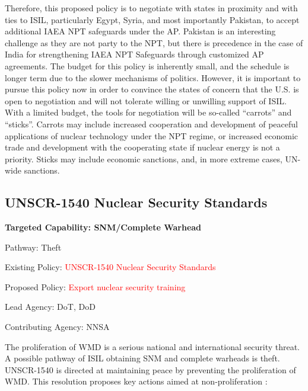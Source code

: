 \documentclass{report}
\begin{document}
Therefore, this proposed policy is to negotiate with states in proximity and with ties to ISIL, particularly Egypt, Syria, and most importantly Pakistan, to accept additional IAEA NPT safeguards under the AP. Pakistan is an interesting challenge as they are not party to the NPT, but there is precedence in the case of India for strengthening IAEA NPT Safeguards through customized AP agreements. The budget for this policy is inherently small, and the schedule is longer term due to the slower mechanisms of politics.  However, it is important to pursue this policy now in order to convince the states of concern that the U.S. is open to negotiation and will not tolerate willing or unwilling support of ISIL. With a limited budget, the tools for negotiation will be so-called \enquote{carrots} and \enquote{sticks}. Carrots may include increased cooperation and development of peaceful applications of nuclear technology under the NPT regime, or increased economic trade and development with the cooperating state if nuclear energy is not a priority. Sticks may include economic sanctions, and, in more extreme cases, UN-wide sanctions.



\subsection{UNSCR-1540 Nuclear Security Standards}



\bfseries Targeted Capability: SNM/Complete Warhead

Pathway: Theft

Existing Policy:  \textcolor{red}{UNSCR-1540 Nuclear Security Standards}

Proposed Policy:  \textcolor{red}{Export nuclear security training}

Lead Agency: DoT, DoD

Contributing Agency: NNSA  \normalfont


The proliferation of  WMD is a serious national and international security threat. A possible pathway of ISIL obtaining SNM and complete warheads is theft.  UNSCR-1540 is directed at maintaining peace by preventing the proliferation of  WMD. This resolution proposes key actions aimed at non-proliferation \cite{Gomes2007a}:
\end{document}
